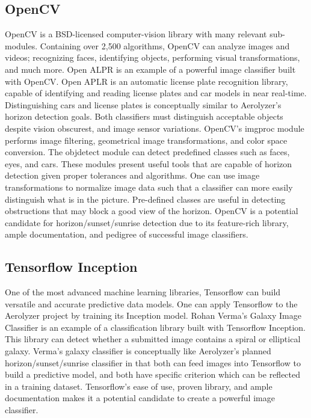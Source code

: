 \documentclass[onecolumn, draftclsnofoot,10pt, compsoc]{IEEEtran}
\begin{document}
\begin{singlespace}
	\subsection{OpenCV}
		OpenCV is a BSD-licensed computer-vision library with many relevant sub-modules.
		Containing over 2,500 algorithms, OpenCV can analyze images and videos; recognizing faces, identifying objects, performing visual transformations, and much more.
		Open ALPR is an example of a powerful image classifier built with OpenCV.
		Open APLR is an automatic license plate recognition library, capable of identifying and reading license plates and car models in near real-time.
		Distinguishing cars and license plates is conceptually similar to Aerolyzer’s horizon detection goals.
		Both classifiers must distinguish acceptable objects despite vision obscurest, and image sensor variations.
		OpenCV’s imgproc module performs image filtering, geometrical image transformations, and color space conversion.
		The objdetect module can detect predefined classes such as faces, eyes, and cars.
		These modules present useful tools that are capable of horizon detection given proper tolerances and algorithms.
		One can use image transformations to normalize image data such that a classifier can more easily distinguish what is in the picture.
		Pre-defined classes are useful in detecting obstructions that may block a good view of the horizon.
		OpenCV is a potential candidate for horizon/sunset/sunrise detection due to its feature-rich library, ample documentation, and pedigree of successful image classifiers. \cite{matthill}

	\subsection{Tensorflow Inception}
		One of the most advanced machine learning libraries, Tensorflow can build versatile and accurate predictive data models.
		One can apply Tensorflow to the Aerolyzer project by training its Inception model.
		Rohan Verma’s Galaxy Image Classifier is an example of a classification library built with Tensorflow Inception.
		This library can detect whether a submitted image contains a spiral or elliptical galaxy.
		Verma’s galaxy classifier is conceptually like Aerolyzer’s planned horizon/sunset/sunrise classifier in that both can feed images into Tensorflow to build a predictive model, and both have specific criterion which can be reflected in a training dataset.
		Tensorflow’s ease of use, proven library, and ample documentation makes it a potential candidate to create a powerful image classifier. \cite{rhnvrm}
		


\end{singlespace}
\end{document}
